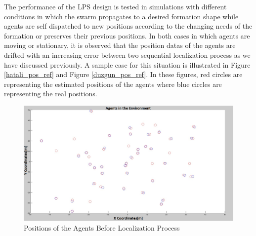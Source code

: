 The performance of the LPS design is tested in simulations with different conditions in which the swarm propagates to a desired formation shape while agents are self dispatched to new positions according to the changing needs of the formation or preserves their previous positions. In both cases in which agents are moving or stationary, it is observed that the position datas of the agents are drifted with an increasing error between two  sequential localization process as we have discussed previously. A sample case for this situation is illustrated in Figure \ref{hatali_pos_ref} and Figure \ref{duzgun_pos_ref}. In these figures, red circles are representing the estimated positions of the agents where blue circles are representing the real positions. 

\begin{figure}[H]
\centering
\captionsetup{format=hang,justification=centerfirst}
\caption{Positions of the Agents Before Localization Process} \label{hatali_pos_ref}
\centerline{
\includegraphics[scale = 0.35]{Pozisyon_1_Hatali}}
\label{fig:lps}
\end{figure}

